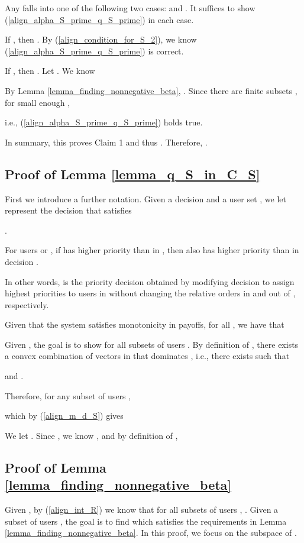 \documentclass[prodmode,acmtompecs]{acmsmall}
\begin{document}
Any  falls into one of the following two cases:  and . It suffices to show (\ref{align_alpha_S_prime_q_S_prime}) in each case. 

If , then . By (\ref{align_condition_for_S_2}), we know (\ref{align_alpha_S_prime_q_S_prime}) is correct. 

If , then . Let . We know


By Lemma \ref{lemma_finding_nonnegative_beta}, . Since there are finite subsets , for small enough , 


i.e., (\ref{align_alpha_S_prime_q_S_prime}) holds true. 

In summary, this proves Claim 1 and thus . Therefore, . 

\subsection{Proof of Lemma \ref{lemma_q_S_in_C_S}}
\label{pf_lemma_q_S_in_C_S}
First we introduce a further notation. Given a decision  and a user set , we let  represent the decision that satisfies
\begin{longitem}
\item . 
\item For users  or , if  has higher priority than  in , then  also has higher priority than  in decision . 
\end{longitem}
In other words,  is the priority decision obtained by modifying decision  to assign highest priorities to users in  without changing the relative orders in and out of , respectively. 

Given that the system satisfies monotonicity in payoffs, for all , we have that


Given , the goal is to show  for all subsets of users . 
By definition of , there exists a convex combination of vectors in  that dominates , i.e., there exists  such that 

and . 

Therefore, for any subset of users , 

which by (\ref{align_m_d_S}) gives


We let . Since , we know  , and by definition of , 


\subsection{Proof of Lemma \ref{lemma_finding_nonnegative_beta}}
\label{pf_lemma_finding_nonnegative_beta}
Given , by (\ref{align_int_R}) we know that for all subsets of users , . 
Given a subset of users , the goal is to find  which satisfies the requirements in Lemma \ref{lemma_finding_nonnegative_beta}. 
In this proof, we focus on the subspace of . 
\end{document}
